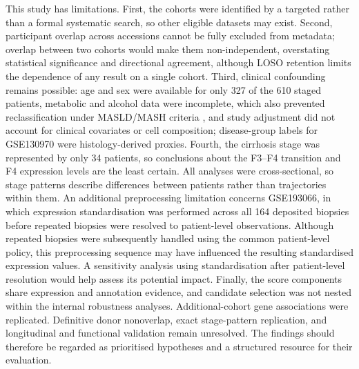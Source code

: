 \documentclass[11pt,a4paper]{article}
\begin{document}
This study has limitations. First, the cohorts were identified by a targeted rather than a formal systematic search, so other eligible datasets may exist. Second, participant overlap across accessions cannot be fully excluded from metadata; overlap between two cohorts would make them non-independent, overstating statistical significance and directional agreement, although LOSO retention limits the dependence of any result on a single cohort. Third, clinical confounding remains possible: age and sex were available for only 327 of the 610 staged patients, metabolic and alcohol data were incomplete, which also prevented reclassification under MASLD/MASH criteria \cite{rinella2023}, and study adjustment did not account for clinical covariates or cell composition; disease-group labels for GSE130970 were histology-derived proxies. Fourth, the cirrhosis stage was represented by only 34 patients, so conclusions about the F3--F4 transition and F4 expression levels are the least certain. All analyses were cross-sectional, so stage patterns describe differences between patients rather than trajectories within them. An additional preprocessing limitation concerns GSE193066, in which expression standardisation was performed across all 164 deposited biopsies before repeated biopsies were resolved to patient-level observations. Although repeated biopsies were subsequently handled using the common patient-level policy, this preprocessing sequence may have influenced the resulting standardised expression values. A sensitivity analysis using standardisation after patient-level resolution would help assess its potential impact. Finally, the score components share expression and annotation evidence, and candidate selection was not nested within the internal robustness analyses. Additional-cohort gene associations were replicated. Definitive donor nonoverlap, exact stage-pattern replication, and longitudinal and functional validation remain unresolved. The findings should therefore be regarded as prioritised hypotheses and a structured resource for their evaluation.

\end{document}
